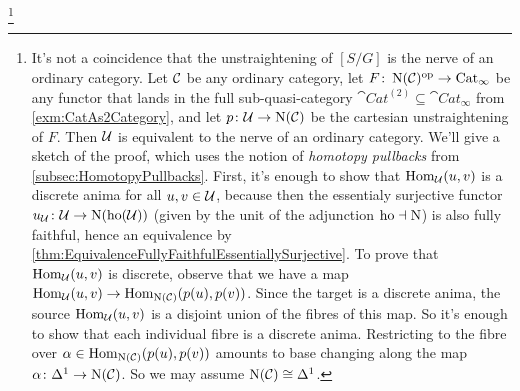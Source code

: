 \begin{numpar}
	\footnote{\label{footnote:UnstraighteningOrdinaryCategory}It's not a coincidence that the unstraightening of $[S/G]$ is the nerve of an ordinary category. Let $\mathcal{C}$ be any ordinary category, let $F\colon \operatorname{N}(\mathcal{C})^{\mathrm{op}}\rightarrow \mathrm{Cat}_\infty$ be any functor that lands in the full sub-quasi-category $\cat{Cat}^{(2)}\subseteq \cat{Cat}_\infty$ from \cref{exm:CatAs2Category}, and let $p\colon \mathcal{U}\rightarrow\operatorname{N}(\mathcal{C})$ be the cartesian unstraightening of $F$. Then $\mathcal{U}$ is equivalent to the nerve of an ordinary category. We'll give a sketch of the proof, which uses the notion of \emph{homotopy pullbacks} from \cref{subsec:HomotopyPullbacks}. First, it's enough to show that $\operatorname{Hom}_{\mathcal{U}}(u,v)$ is a discrete anima for all $u,v\in \mathcal{U}$, because then the essentialy surjective functor $u_{\mathcal{U}}\colon \mathcal{U}\rightarrow \operatorname{N}(\operatorname{ho}(\mathcal{U}))$ (given by the unit of the adjunction $\operatorname{ho}\dashv \operatorname{N}$) is also fully faithful, hence an equivalence by \cref{thm:EquivalenceFullyFaithfulEssentiallySurjective}. To prove that $\operatorname{Hom}_{\mathcal{U}}(u,v)$ is discrete, observe that we have a map $\operatorname{Hom}_{\mathcal{U}}(u,v)\rightarrow \operatorname{Hom}_{\operatorname{N}(\mathcal{C})}(p(u),p(v))$. Since the target is a discrete anima, the source $\operatorname{Hom}_{\mathcal{U}}(u,v)$ is a disjoint union of the fibres of this map. So it's enough to show that each individual fibre is a discrete anima. Restricting to the fibre over $\alpha\in\operatorname{Hom}_{\operatorname{N}(\mathcal{C})}(p(u),p(v))$ amounts to base changing along the map $\alpha\colon \Delta^1\rightarrow \operatorname{N}(\mathcal{C})$. So we may assume $\operatorname{N}(\mathcal{C})\cong \Delta^1$.
	
}
\end{numpar}
